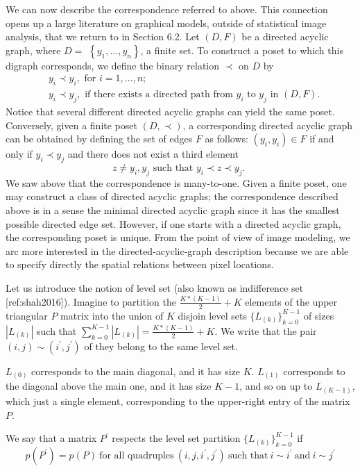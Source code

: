 \documentclass[11pt]{amsart}
\begin{document}
We can now describe the correspondence referred to above. This connection opens up a large literature on graphical models, outside of statistical image analysis, that we return to in Section 6.2. Let $(D, F)$ be a directed acyclic graph, where $D=$ $\left\{y_1, \ldots, y_n\right\}$, a finite set. To construct a poset to which this digraph corresponds, we define the binary relation $\prec$ on $D$ by
$$
\begin{aligned}
& y_i \prec y_i, \text { for } i=1, \ldots, n \text {; } \\
& y_i \prec y_j, \text { if there exists a directed path from } y_i \text { to } y_j \text { in }(D, F) .
\end{aligned}
$$
Notice that several different directed acyclic graphs can yield the same poset.
Conversely, given a finite poset $(D, \prec)$, a corresponding directed acyclic graph can be obtained by defining the set of edges $F$ as follows:
$\left(y_i, y_i\right) \in F$ if and only if $y_i \prec y_j$ and there does not exist a third element
$$
z \neq y_i, y_j \text { such that } y_i \prec z \prec y_j \text {. }
$$
We saw above that the correspondence is many-to-one. Given a finite poset, one may construct a class of directed acyclic graphs; the correspondence described above is in a sense the minimal directed acyclic graph since it has the smallest possible directed edge set. However, if one starts with a directed acyclic graph, the corresponding poset is unique. From the point of view of image modeling, we arc more interested in the directed-acyclic-graph description because we are able to specify directly the spatial relations between pixel locations.

Let us introduce the notion of level set (also known as indifference set [ref:shah2016]). Imagine to partition the $\frac{K*(K-1)}{2}+K$ elements of the upper triangular $P$ matrix into the union of $K$ disjoin level sets $\{L_{(k)}\}_{k=0}^{K-1}$ of sizes $\left| L_{(k)} \right|$ such that $\sum_{k=0}^{K-1}\left| L_{(k)} \right| =\frac{K*(K-1)}{2}+K$. We write that the pair $(i,j) \sim (i^\prime,j^\prime)$ of they belong to the same level set. 

$L_{(0)}$ corresponds to the main diagonal, and it has size $K$. $L_{(1)}$ corresponds to the diagonal above the main one, and it has size $K-1$, and so on up to $L_{(K-1)}$, which just a single element, corresponding to the upper-right entry of the matrix $P$.

We say that a matrix $P^\prime$ respects the level set partition $\{L_{(k)}\}_{k=0}^{K-1}$  if
\begin{equation}\label{eqn:levelsets}
p(P^\prime) = p(P) \ \text{for all quadruples} \ \left(i,j,i^\prime,j^\prime \right) \ \text{such that} \  i\sim i^\prime \ \text{and} \ i \sim j^\prime
\end{equation}
\end{document}
